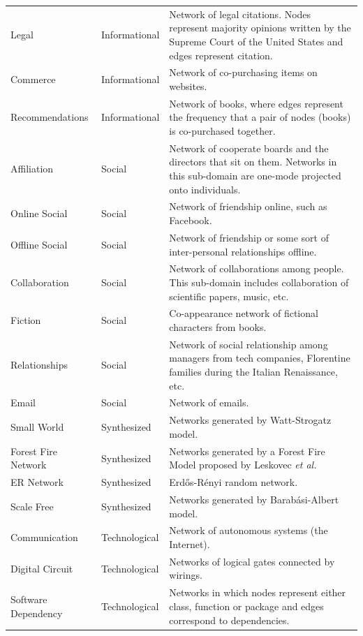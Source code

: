 \documentclass[..]{revtex4}
\begin{document}
\begin{longtable}{| l | l | p{9cm} |}
      Legal &  Informational & Network of legal citations. Nodes represent majority opinions written by the Supreme Court of the United States and edges represent citation.\\ %
      Commerce &  Informational & Network of co-purchasing items on websites.\\  %
      Recommendations &  Informational & Network of books, where edges represent the frequency that a pair of nodes (books) is co-purchased together.\\  %
      Affiliation &  Social & Network of cooperate boards and the directors that sit on them. Networks in this sub-domain are one-mode projected onto individuals.\\  %
      Online Social &  Social & Network of friendship online, such as Facebook.\\  %
      Offline Social &  Social & Network of friendship or some sort of inter-personal relationships offline.\\  %
      Collaboration &  Social & Network of collaborations among people. This sub-domain includes collaboration of scientific papers, music, etc.\\  %
      Fiction &  Social & Co-appearance network of fictional characters from books.\\  %
      Relationships &  Social & Network of social relationship among managers from tech companies, Florentine families during the Italian Renaissance, etc.\\ %
      Email &  Social & Network of emails.\\ %
      Small World &  Synthesized & Networks generated by Watt-Strogatz model.\\  %
      Forest Fire Network &  Synthesized & Networks generated by a Forest Fire Model proposed by Leskovec \textit{et al.} \\  %
      ER Network &  Synthesized & Erd\H{o}s-R\'enyi random network. \\  %
      Scale Free &  Synthesized & Networks generated by Barab\'asi-Albert model.\\  %
      Communication &  Technological & Network of autonomous systems (the Internet).\\  %
      Digital Circuit &  Technological & Networks of logical gates connected by wirings.\\ %
      Software Dependency &  Technological & Networks in which nodes represent either class, function or package and edges correspond to dependencies.\\  %

\end{longtable}
\end{document}
